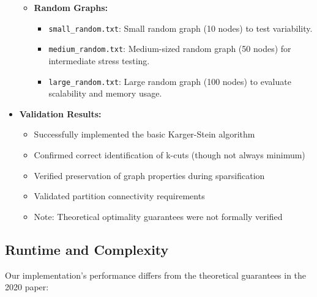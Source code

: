 \documentclass[11pt]{article}
\begin{document}
\begin{itemize}
\begin{itemize}
    \item \textbf{Random Graphs:}
    \begin{itemize}
        \item \texttt{small\_random.txt}: Small random graph (10 nodes) to test variability.
        \item \texttt{medium\_random.txt}: Medium-sized random graph (50 nodes) for intermediate stress testing.
        \item \texttt{large\_random.txt}: Large random graph (100 nodes) to evaluate scalability and memory usage.
    \end{itemize}
\end{itemize}


    \item \textbf{Validation Results:}
    \begin{itemize}
        \item Successfully implemented the basic Karger-Stein algorithm
        \item Confirmed correct identification of k-cuts (though not always minimum)
        \item Verified preservation of graph properties during sparsification
        \item Validated partition connectivity requirements
        \item Note: Theoretical optimality guarantees were not formally verified
    \end{itemize}
\end{itemize}

\subsection{Runtime and Complexity}

Our implementation's performance differs from the theoretical guarantees in the 2020 paper:
\end{document}

